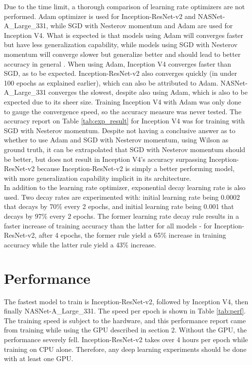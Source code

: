 \documentclass[a4paper]{article}
\begin{document}
Due to the time limit, a thorough comparison of learning rate optimizers are not performed. Adam optimizer is used for Inception-ResNet-v2 and NASNet-A\_Large\_331, while SGD with Nesterov momentum and Adam are used for Inception V4. What is expected is that models using Adam will converges faster but have less generalization capability, while models using SGD with Nesterov momentum will converge slower but generalize better and should lead to better accuracy in general \cite{Wilson2017}. When using Adam, Inception V4 converges faster than SGD, as to be expected. Inception-ResNet-v2 also converges quickly (in under 100 epochs as explained earlier), which can also be attributed to Adam. NASNet-A\_Large\_331 converges the slowest, despite also using Adam, which is also to be expected due to its sheer size. Training Inception V4 with Adam was only done to gauge the convergence speed, so the accuracy measure was never tested. The accuracy report on Table \ref{tab:exp_result} for Inception V4 was for training with SGD with Nesterov momentum. Despite not having a conclusive answer as to whether to use Adam and SGD with Nesterov momentum, using Wilson \cite{Wilson2017} as ground truth, it can be extrapolated that SGD with Nesterov momentum should be better, but does not result in Inception V4's accuracy surpassing Inception-ResNet-v2 because Inception-ResNet-v2 is simply a better performing model, with more generalization capability implicit in its architecture. \\

In addition to the learning rate optimizer, exponential decay learning rate is also used. Two decay rates are experimented with: initial learning rate being 0.0002 that decays by 70\% every 2 epochs, and initial learning rate being 0.001 that decays by 97\% every 2 epochs. The former learning rate decay rule results in a faster increase of training accuracy than the latter for all models - for Inception-ResNet-v2, after 4 epochs, the former rule yield a 65\% increase in training accuracy while the latter rule yield a 43\% increase.

\section{Performance}

The fastest model to train is Inception-ResNet-v2, followed by Inception V4, then finally NASNet-A\_Large\_331. The speed per epoch is shown in Table \ref{tab:perf}. The training speed is subject to the hardware, and this performance report came from training while using the GPU described in section 2. Without the GPU, the performance severely fell. Inception-ResNet-v2 takes over 4 hours per epoch while training on CPU alone. Therefore, any deep learning experiments should be done with at least one GPU.
\end{document}
